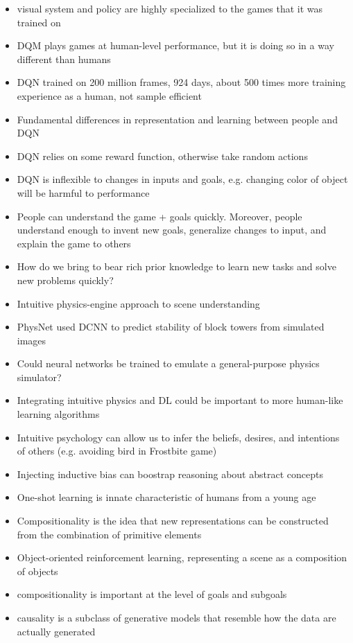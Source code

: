 \begin{itemize}
  \item visual system and policy are highly specialized to the games that it was trained on
  \item DQM plays games at human-level performance, but it is doing so in a way different than humans
  \item DQN trained on 200 million frames, 924 days, about 500 times more training experience as a human, not sample efficient
  \item Fundamental differences in representation and learning between people and DQN
  \item DQN relies on some reward function, otherwise take random actions
  \item DQN is inflexible to changes in inputs and goals, e.g. changing color of object will be harmful to performance
  \item People can understand the game + goals quickly. Moreover, people understand enough to invent new goals, generalize changes to input, and explain the game to others
  \item How do we bring to bear rich prior knowledge to learn new tasks and solve new problems quickly?
  \item Intuitive physics-engine approach to scene understanding
  \item PhysNet used DCNN to predict stability of block towers from simulated images
  \item Could neural networks be trained to emulate a general-purpose physics simulator?
  \item Integrating intuitive physics and DL could be important to more human-like learning algorithms
  \item Intuitive psychology can allow us to infer the beliefs, desires, and intentions of others (e.g. avoiding bird in Frostbite game)
  \item Injecting inductive bias can boostrap reasoning about abstract concepts
  \item One-shot learning is innate characteristic of humans from a young age
  \item Compositionality is the idea that new representations can be constructed from the combination of primitive elements
  \item Object-oriented reinforcement learning, representing a scene as a composition of objects
  \item compositionality is important at the level of goals and subgoals
  \item causality is a subclass of generative models that resemble how the data are actually generated

\end{itemize}
